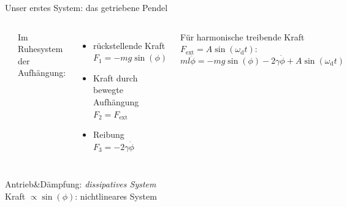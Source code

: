 \begin{frame}{Unser erstes System: das getriebene Pendel}

  \begin{columns}

    \includegraphics[width=1.05\linewidth]{Figures/Pendel.pdf}


    Im Ruhesystem der Aufhängung:

    \begin{itemize}
    \item rückstellende Kraft $F_1 = -mg\sin(\phi)$
    \item Kraft durch bewegte Aufhängung $F_2 = F_\mathrm{ext}$
    \item Reibung $F_3 = -2\gamma\dot{\phi}$
    \end{itemize}
    \pause
    Für harmonische treibende Kraft $F_\mathrm{ext} = A\sin(\omega_\mathrm{d}t)$:\\[-2.5ex]
    \[  m l \ddot{\phi} = -mg\sin(\phi) - 2\gamma\dot{\phi} + A\sin(\omega_\mathrm{d}t)\]
  \end{columns}
  \pause
  \vspace{1.0ex}
  Antrieb\&Dämpfung: \emph{dissipatives System}\\
  Kraft $\propto \sin(\phi)$: \alert{nichtlineares System}
\end{frame}


